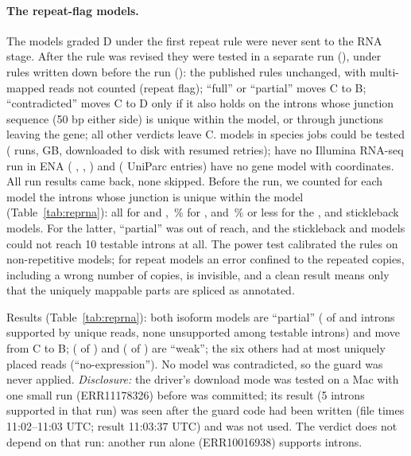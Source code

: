 \documentclass[11pt]{article}
\begin{document}
\paragraph{The repeat-flag models.} The  models graded D under the first repeat rule were never sent to the
RNA stage. After the rule was revised they were tested in a separate run (), under rules written
down before the run (): the published rules unchanged, with multi-mapped reads not
counted (repeat flag); ``full'' or ``partial'' moves C to B; ``contradicted'' moves C to D only if it also holds on the
introns whose junction sequence (50 bp either side) is unique within the model, or through junctions leaving the gene; all
other verdicts leave C.  models in  species jobs could be tested ( runs,
 GB, downloaded to disk with resumed retries);  have no Illumina RNA-seq run in ENA
( ,  ,  ) and 
( UniParc entries) have no gene model with coordinates. All  run results came
back, none skipped. Before the run, we counted for each model the introns whose junction is unique within the model
(Table~\ref{tab:reprna}): all for  and , \,\% for , and
\,\% or less for the ,  and stickleback models. For the latter,
``partial'' was out of reach, and the stickleback and  models could not reach 10 testable introns at all. The
power test calibrated the rules on non-repetitive models; for repeat models an error confined to the repeated copies,
including a wrong number of copies, is invisible, and a clean result means only that the uniquely mappable parts are
spliced as annotated.

Results (Table~\ref{tab:reprna}): both  isoform models are ``partial''
( of  and  introns supported by unique reads,
none unsupported among  testable introns) and move from C to B;  (
of ) and  ( of ) are ``weak''; the six
others had at most  uniquely placed reads (``no-expression''). No model was contradicted, so the
guard was never applied. \emph{Disclosure:} the driver's download mode was tested on a Mac with one small 
run (ERR11178326) before  was committed; its result (5 introns supported in that run) was seen after the
guard code had been written (file times 11:02--11:03 UTC; result 11:03:37 UTC) and was not used. The verdict does not
depend on that run: another run alone (ERR10016938) supports  introns.
\end{document}
